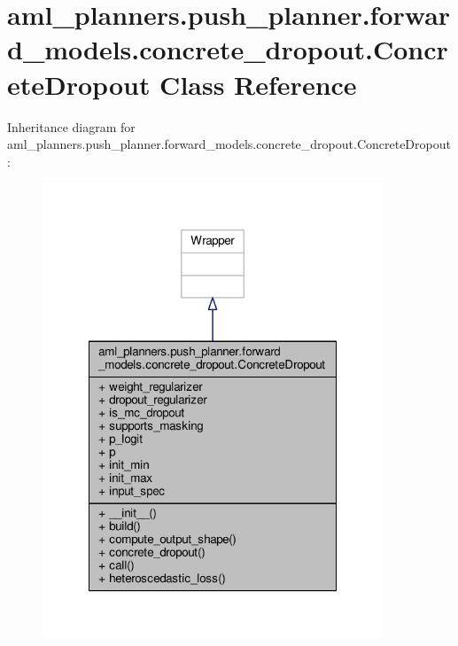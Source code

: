 \hypertarget{classaml__planners_1_1push__planner_1_1forward__models_1_1concrete__dropout_1_1_concrete_dropout}{\section{aml\-\_\-planners.\-push\-\_\-planner.\-forward\-\_\-models.\-concrete\-\_\-dropout.\-Concrete\-Dropout Class Reference}
\label{classaml__planners_1_1push__planner_1_1forward__models_1_1concrete__dropout_1_1_concrete_dropout}
}


Inheritance diagram for aml\-\_\-planners.\-push\-\_\-planner.\-forward\-\_\-models.\-concrete\-\_\-dropout.\-Concrete\-Dropout\-:\nopagebreak
\begin{figure}[H]
\begin{center}
\leavevmode
\includegraphics[width=288pt]{classaml__planners_1_1push__planner_1_1forward__models_1_1concrete__dropout_1_1_concrete_dropout__inherit__graph}
\end{center}
\end{figure}


